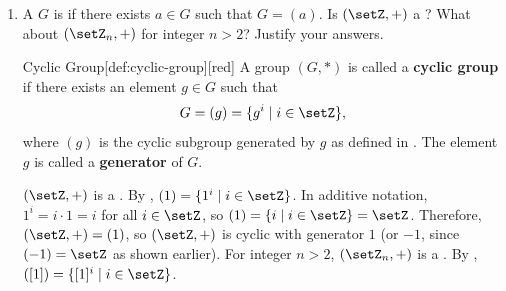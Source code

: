\begin{enumerate}
\begin{subprove}
\begin{itemize}
      \item \textbf{Closure:} For any \((a, b), (c, d) \in G\), \((a, b) + (c, d) = (a + c, b + d) \in G\) since \(a + c, b + d \in \setZ_{2}\).
      \item \textbf{Associativity:} For any \((a, b), (c, d), (e, f) \in G\), \(((a, b) + (c, d)) + (e, f) = (a + c, b + d) + (e, f) = ((a + c) + e, (b + d) + f) = (a + (c + e), b + (d + f)) = (a, b) + (c + e, d + f) = (a, b) + ((c, d) + (e, f))\) by the associativity of addition in \(\setZ_{2}\).
      \item \textbf{Existence of Identity:} The identity element is \((0, 0)\) since for any \((a, b) \in G\), \((0, 0) + (a, b) = (0 + a, 0 + b) = (a, b)\) and \((a, b) + (0, 0) = (a + 0, b + 0) = (a, b)\).
      \item \textbf{Existence of Inverse:} For each \((a, b) \in G\), the inverse element is \((-a, -b) = (a, b)\) since \((a, b) + (a, b) = (a + a, b + b) = (0, 0)\) in \(\setZ_{2}\).
    \end{itemize}
    Since all four group properties are satisfied, it follows that \((\setZ_{2} \times \setZ_{2}, +)\) is a .
  \end{subprove}
  \item A  \(G\) is  if there exists \(a \in G\) such that \(G = (a)\).
  Is \((\setZ, +)\) a ?
  What about \((\setZ_{n}, +)\) for integer \(n > 2\)?
  Justify your answers.
  \begin{define}{Cyclic Group}[def:cyclic-group][red]
    A group $(G, *)$ is called a \textbf{cyclic group} if there exists 
    an element \(g \in G\) such that 
    \[
    G = (g) = \{g^i \mid i \in \setZ\},
    \] 
    where \((g)\) is the cyclic subgroup generated by \(g\) 
    as defined in . 
    The element \(g\) is called a \textbf{generator} of \(G\).
  \end{define}
  \begin{subprove}
    \((\setZ, +)\) is a . 
    By , \((1) = \{1^{i} \mid i \in \setZ\}\). 
    In additive notation, \(1^{i} = i \cdot 1 = i\) for all \(i \in \setZ\), 
    so \((1) = \{i \mid i \in \setZ\} = \setZ\). 
    Therefore, \((\setZ, +) = (1)\), so \((\setZ, +)\) is cyclic with 
    generator \(1\) (or \(-1\), since \((-1) = \setZ\) as shown earlier).\proofstep    
    For integer \(n > 2\), \((\setZ_{n}, +)\) is a . 
    By , \(([1]) = \{[1]^{i} \mid i \in \setZ\}\). 

\end{subprove}
\end{enumerate}
